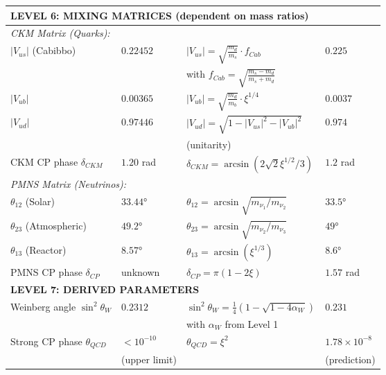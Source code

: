 \documentclass[12pt,a4paper]{article}
\begin{document}
\begin{longtable}{p{5cm}p{4cm}p{3.5cm}p{3.5cm}}
	\midrule
	\multicolumn{4}{l}{\textbf{LEVEL 6: MIXING MATRICES (dependent on mass ratios)}} \\
	\midrule
	
	\multicolumn{4}{l}{\textit{CKM Matrix (Quarks):}} \\
	
	$|V_{us}|$ (Cabibbo) & $0.22452$ & $|V_{us}| = \sqrt{\frac{m_d}{m_s}} \cdot f_{Cab}$ & $0.225$ \\
	& & with $f_{Cab} = \sqrt{\frac{m_s - m_d}{m_s + m_d}}$ & \\[0.3em]
	
	$|V_{ub}|$ & $0.00365$ & $|V_{ub}| = \sqrt{\frac{m_d}{m_b}} \cdot \xi^{1/4}$ & $0.0037$ \\
	
	$|V_{ud}|$ & $0.97446$ & $|V_{ud}| = \sqrt{1 - |V_{us}|^2 - |V_{ub}|^2}$ & $0.974$ \\
	& & (unitarity) & \\[0.3em]
	
	CKM CP phase $\delta_{CKM}$ & $1.20$ rad & $\delta_{CKM} = \arcsin(2\sqrt{2}\xi^{1/2}/3)$ & $1.2$ rad \\
	
	\multicolumn{4}{l}{\textit{PMNS Matrix (Neutrinos):}} \\
	
	$\theta_{12}$ (Solar) & $33.44°$ & $\theta_{12} = \arcsin\sqrt{m_{\nu_1}/m_{\nu_2}}$ & $33.5°$ \\
	
	$\theta_{23}$ (Atmospheric) & $49.2°$ & $\theta_{23} = \arcsin\sqrt{m_{\nu_2}/m_{\nu_3}}$ & $49°$ \\
	
	$\theta_{13}$ (Reactor) & $8.57°$ & $\theta_{13} = \arcsin(\xi^{1/3})$ & $8.6°$ \\
	
	PMNS CP phase $\delta_{CP}$ & unknown & $\delta_{CP} = \pi(1 - 2\xi)$ & $1.57$ rad \\
	
	\midrule
	\multicolumn{4}{l}{\textbf{LEVEL 7: DERIVED PARAMETERS}} \\
	\midrule
	
	Weinberg angle $\sin^2\theta_W$ & $0.2312$ & $\sin^2\theta_W = \frac{1}{4}(1-\sqrt{1-4\alpha_W})$ & $0.231$ \\
	& & with $\alpha_W$ from Level 1 & \\[0.3em]
	
	Strong CP phase $\theta_{QCD}$ & $< 10^{-10}$ & $\theta_{QCD} = \xi^{2}$ & $1.78 \times 10^{-8}$ \\
	& (upper limit) & & (prediction) \\
	
\end{longtable}
\end{document}
